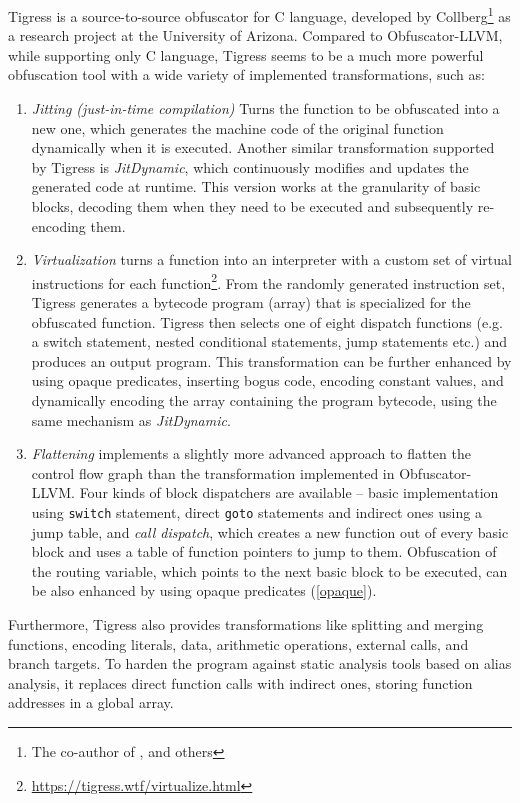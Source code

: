 \documentclass[
  digital, %
  notable,   %
  twoside, %
  nolof,     %
  nolot,     %
]{fithesis3}
\theoremstyle{definition}
\begin{document}
Tigress is a source-to-source obfuscator for C language, developed by Collberg\footnote{The co-author of \cite{taxonomy_obf}, \cite{manufacturing_opaque} and others} as a research project at the University of Arizona. Compared to Obfuscator-LLVM, while supporting only C language, Tigress seems to be a much more powerful obfuscation tool with a wide variety of implemented transformations, such as:
\begin{enumerate}
    \item \textit{Jitting (just-in-time compilation)} Turns the function to be obfuscated into a new one, which generates the machine code of the original function dynamically when it is executed. Another similar transformation supported by Tigress is \textit{JitDynamic}, which continuously modifies and updates the generated code at runtime. This version works at the granularity of basic blocks, decoding them when they need to be executed and subsequently re-encoding them.
    
    \item \textit{Virtualization} turns a function into an interpreter with a custom set of virtual instructions for each function\footnote{\url{https://tigress.wtf/virtualize.html}}. From the randomly generated instruction set, Tigress generates a bytecode program (array) that is specialized for the obfuscated function. Tigress then selects one of eight dispatch functions (e.g. a switch statement, nested conditional statements, jump statements etc.) and produces an output program. This transformation can be further enhanced by using opaque predicates, inserting bogus code, encoding constant values, and dynamically encoding the array containing the program bytecode, using the same mechanism as \textit{JitDynamic}. 
    
    \item \textit{Flattening} implements a slightly more advanced approach to flatten the control flow graph than the transformation implemented in Obfuscator-LLVM. Four kinds of block dispatchers are available -- basic implementation using \texttt{switch} statement, direct \texttt{goto} statements and indirect ones using a jump table, and \textit{call dispatch}, which creates a new function out of every basic block and uses a table of function pointers to jump to them. Obfuscation of the routing variable, which points to the next basic block to be executed, can be also enhanced by using opaque predicates (\ref{opaque}).
\end{enumerate}
Furthermore, Tigress also provides transformations like splitting and merging functions, encoding literals, data, arithmetic operations, external calls, and branch targets. To harden the program against static analysis tools based on alias analysis, it replaces direct function calls with indirect ones, storing function addresses in a global array. 
\end{document}
